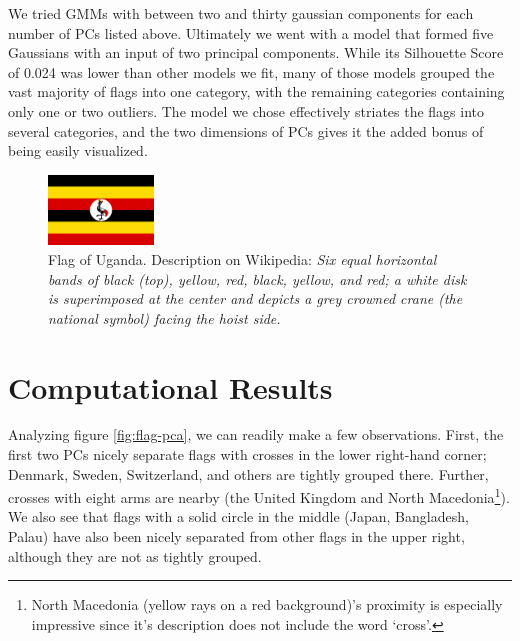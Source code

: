 \documentclass[11pt]{amsart}
\begin{document}
We tried GMMs with between two and thirty gaussian components for each number of
PCs listed above. Ultimately we went with a model that formed five Gaussians
with an input of two principal components. While its Silhouette Score of 0.024
was lower than other models we fit, many of those models grouped the vast
majority of flags into one category, with the remaining categories containing
only one or two outliers. The model we chose effectively striates the flags into
several categories, and the two dimensions of PCs gives it the added bonus of
being easily visualized.

\begin{figure}[!ht]
    \centering
    \includegraphics[width=0.25\textwidth]{./res/Flag_of_Uganda.svg.png}
    \caption{Flag of Uganda. Description on Wikipedia: \emph{Six equal
    horizontal bands of black (top), yellow, red, black, yellow, and red; a
    white disk is superimposed at the center and depicts a grey crowned crane
    (the national symbol) facing the hoist side. } \label{fig:uganda}}
\end{figure}

\section{Computational Results}\label{sec:results}

Analyzing figure \ref{fig:flag-pca}, we can readily make a few observations.
First, the first two PCs nicely separate flags with crosses in the lower
right-hand corner; Denmark, Sweden, Switzerland, and others are tightly grouped
there. Further, crosses with eight arms are nearby (the United Kingdom and North
Macedonia\footnote{North Macedonia (yellow rays on a red background)'s proximity
is especially impressive since it's description does not include the word
`cross'.}). We also see that flags with a solid circle in the middle (Japan,
Bangladesh, Palau) have also been nicely separated from other flags in the upper
right, although they are not as tightly grouped. 
\end{document}
